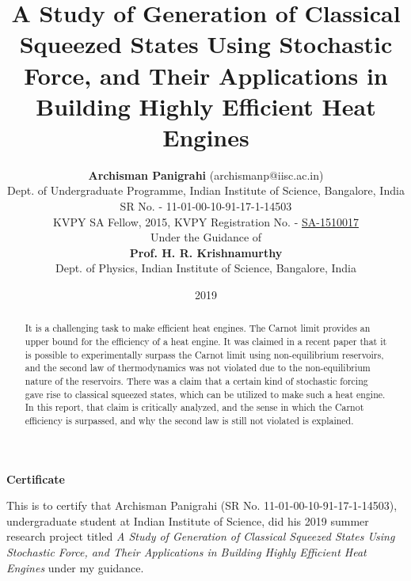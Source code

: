 \documentclass[12pt, twoside]{article}
\newcommand\blankpage{%
	\null
	\thispagestyle{empty}%
	\newpage}
\begin{document}
\setpagewiselinenumbers


\title{\textbf{A Study of Generation of Classical Squeezed States Using Stochastic Force, and Their Applications in Building Highly Efficient Heat Engines}}

\date{2019}



\author{
	\textbf{Archisman Panigrahi} \footnotesize(archismanp@iisc.ac.in) \\
	\footnotesize{Dept. of Undergraduate Programme, Indian Institute of Science, Bangalore, India}\\
	\footnotesize SR No. - 11-01-00-10-91-17-1-14503\\
	\footnotesize KVPY SA Fellow, 2015, KVPY Registration No. - \underline{SA-1510017}\\
 	Under the Guidance of\\
	\textbf{Prof. H. R. Krishnamurthy}\\
	\footnotesize Dept. of Physics, Indian Institute of Science, Bangalore, India}


\maketitle

\begin{abstract}

It is a challenging task to make efficient heat engines. The Carnot limit \cite{resnick_halliday} provides an upper bound for the efficiency of a heat engine. It was claimed in a recent paper \cite{klaers} that it is possible to experimentally surpass the Carnot limit using non-equilibrium reservoirs, and the second law of thermodynamics was not violated due to the non-equilibrium nature of the reservoirs. There was a claim that a certain kind of stochastic forcing gave rise to classical squeezed states, which can be utilized to make such a heat engine. In this report, that claim is critically analyzed, and the sense in which the Carnot efficiency is surpassed, and why the second law is still not violated is explained.

\end{abstract}


\afterpage{\blankpage}
\begin{center}
	\large{\textbf{Certificate}}
\end{center}
\vspace{2 cm}
This is to certify that Archisman Panigrahi (SR No. 11-01-00-10-91-17-1-14503),
undergraduate student at Indian Institute of Science, did his 2019 summer research
project titled \textit{A Study of Generation of Classical Squeezed
	States Using Stochastic Force, and Their
	Applications in Building Highly Efficient
	Heat Engines} under my guidance.\\\\\\
\end{document}
